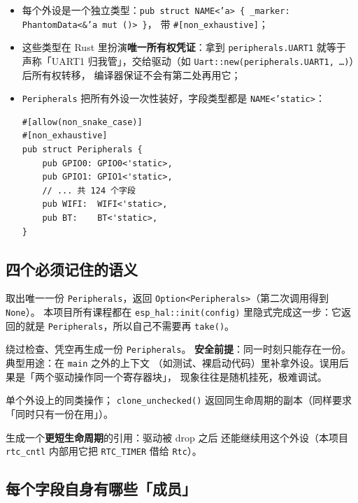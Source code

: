 \documentclass[UTF8,a4paper,11pt,fontset=fandol]{ctexart}
\newcommand{\fld}[1]{\texttt{#1}}
\begin{document}
\begin{itemize}
  \item 每个外设是一个独立类型：\fld{pub struct NAME<'a> \{ \_marker: PhantomData<\&'a mut ()> \}}，
    带 \fld{\#[non\_exhaustive]}；
  \item 这些类型在 Rust 里扮演\textbf{唯一所有权凭证}：拿到 \fld{peripherals.UART1} 就等于
    声称「UART1 归我管」，交给驱动（如 \fld{Uart::new(peripherals.UART1, \dots)}）后所有权转移，
    编译器保证不会有第二处再用它；
  \item \fld{Peripherals} 把所有外设一次性装好，字段类型都是 \fld{NAME<'static>}：

\begin{lstlisting}
#[allow(non_snake_case)]
#[non_exhaustive]
pub struct Peripherals {
    pub GPIO0: GPIO0<'static>,
    pub GPIO1: GPIO1<'static>,
    // ... 共 124 个字段
    pub WIFI:  WIFI<'static>,
    pub BT:    BT<'static>,
}
\end{lstlisting}
\end{itemize}

\subsection{四个必须记住的语义}

\begin{description}[leftmargin=2.2cm,style=nextline]
  \item[\fld{Peripherals::take()}] 取出唯一一份 \fld{Peripherals}，返回
    \fld{Option<Peripherals>}（第二次调用得到 \fld{None}）。
    本项目所有课程都在 \fld{esp\_hal::init(config)} 里隐式完成这一步：它返回的就是
    \fld{Peripherals}，所以自己不需要再 \fld{take()}。
  \item[\fld{unsafe Peripherals::steal()}] 绕过检查、凭空再生成一份 \fld{Peripherals}。
    \textbf{安全前提}：同一时刻只能存在一份。典型用途：在 \fld{main} 之外的上下文
    （如测试、裸启动代码）里补拿外设。误用后果是「两个驱动操作同一个寄存器块」，
    现象往往是随机挂死，极难调试。
  \item[\fld{peripheral.steal() / clone\_unchecked()}] 单个外设上的同类操作；
    \fld{clone\_unchecked()} 返回同生命周期的副本（同样要求「同时只有一份在用」）。
  \item[\fld{reborrow()}] 生成一个\textbf{更短生命周期}的引用：驱动被 drop 之后
    还能继续用这个外设（本项目 \fld{rtc\_cntl} 内部用它把 \fld{RTC\_TIMER} 借给 \fld{Rtc}）。
\end{description}

\subsection{每个字段自身有哪些「成员」}
\end{document}
